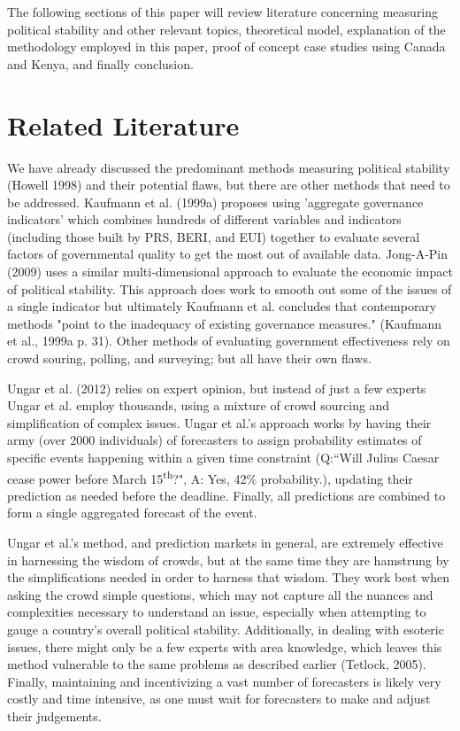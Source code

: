 \documentclass[12pt]{article}
\begin{document}
\begin{spacing}{1.5}
The following sections of this paper will review literature concerning measuring political stability and other relevant topics, theoretical model, explanation of the methodology employed in this paper, proof of concept case studies using Canada and Kenya, and finally conclusion. 

\section*{Related Literature}   

We have already discussed the predominant methods measuring political stability (Howell 1998) and their potential flaws, but there are other methods that need to be addressed. Kaufmann et al. (1999a) proposes using 'aggregate governance indicators' which combines hundreds of different variables and indicators (including those built by PRS, BERI, and EUI) together to evaluate several factors of governmental quality to get the most out of available data. Jong-A-Pin (2009) uses a similar multi-dimensional approach to evaluate the economic impact of political stability. This approach does work to smooth out some of the issues of a single indicator but ultimately Kaufmann et al. concludes that contemporary methods "point to the inadequacy of existing governance measures." (Kaufmann et al., 1999a p. 31). Other methods of evaluating government effectiveness rely on crowd souring, polling, and surveying; but all have their own flaws. 


Ungar et al. (2012) relies on expert opinion, but instead of just a few experts Ungar et al. employ thousands, using a mixture of crowd sourcing and simplification of complex issues. Ungar et al.'s approach works by having their army (over 2000 individuals) of forecasters to assign probability estimates of specific events happening within a given time constraint (Q:``Will Julius Caesar cease power before March 15\textsuperscript{th}?", A: Yes, 42\% probability.), updating their prediction as needed before the deadline. Finally, all predictions are combined to form a single aggregated forecast of the event. 

Ungar et al.'s method, and prediction markets in general, are extremely effective in harnessing the wisdom of crowds, but at the same time they are hamstrung by the simplifications needed in order to harness that wisdom. They work best when asking the crowd simple questions, which may not capture all the nuances and complexities necessary to understand an issue, especially when attempting to gauge a country's overall political stability. Additionally, in dealing with esoteric issues, there might only be a few experts with area knowledge, which leaves this method vulnerable to the same problems as described earlier (Tetlock, 2005). Finally, maintaining and incentivizing a vast number of forecasters is likely very costly and time intensive, as one must wait for forecasters to make and adjust their judgements. 


\end{spacing}
\end{document}
